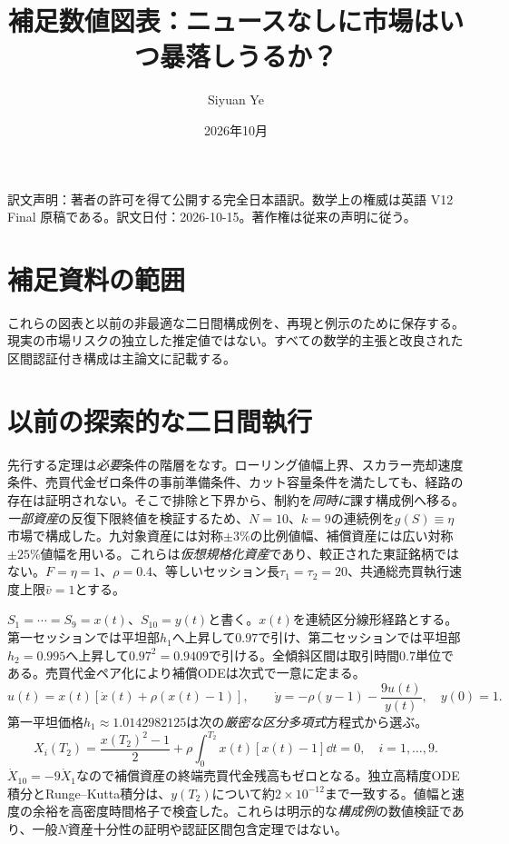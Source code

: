 \documentclass[10pt]{article}
\title{補足数値図表：ニュースなしに市場はいつ暴落しうるか？}
\author{Siyuan Ye}\date{2026年10月}
\begin{document}
\maketitle
{\small 訳文声明：著者の許可を得て公開する完全日本語訳。数学上の権威は英語 V12 Final 原稿である。訳文日付：2026-10-15。著作権は従来の声明に従う。}\par
\section*{補足資料の範囲}
これらの図表と以前の非最適な二日間構成例を、再現と例示のために保存する。現実の市場リスクの独立した推定値ではない。すべての数学的主張と改良された区間認証付き構成は主論文に記載する。
\section*{以前の探索的な二日間執行}

先行する定理は\emph{必要}条件の階層をなす。ローリング値幅上界、スカラー売却速度条件、売買代金ゼロ条件の事前準備条件、カット容量条件を満たしても、経路の存在は証明されない。そこで排除と下界から、制約を\emph{同時に}課す構成例へ移る。\emph{一部資産}の反復下限終値を検証するため、$N=10$、$k=9$の連続例を$g(S)\equiv\eta$市場で構成した。九対象資産には対称$\pm3\%$の比例値幅、補償資産には広い対称$\pm25\%$値幅を用いる。これらは\emph{仮想規格化資産}であり、較正された東証銘柄ではない。$F=\eta=1$、$\rho=0.4$、等しいセッション長$\tau_1=\tau_2=20$、共通総売買執行速度上限$\bar v=1$とする。

$S_1=\cdots=S_9=x(t)$、$S_{10}=y(t)$と書く。$x(t)$を連続区分線形経路とする。第一セッションでは平坦部$h_1$へ上昇して$0.97$で引け、第二セッションでは平坦部$h_2=0.995$へ上昇して$0.97^2=0.9409$で引ける。全傾斜区間は取引時間$0.7$単位である。売買代金ペア化により補償ODEは次式で一意に定まる。
\begin{equation}\label{eq:multiday-witness-ode}
 u(t)=x(t)[\dot x(t)+\rho(x(t)-1)],\qquad
 \dot y=-\rho(y-1)-\frac{9u(t)}{y(t)},\quad y(0)=1.
\end{equation}
第一平坦価格$h_1\approx1.0142982125$は次の\emph{厳密な区分多項式}方程式から選ぶ。
\begin{equation}\label{eq:multiday-closed}
 X_i(T_2)=\frac{x(T_2)^2-1}{2}+\rho\int_0^{T_2}x(t)[x(t)-1]\dd t=0,
 \quad i=1,\ldots,9.
\end{equation}
$\dot X_{10}=-9\dot X_1$なので補償資産の終端売買代金残高もゼロとなる。独立高精度ODE積分とRunge--Kutta積分は、$y(T_2)$について約$2\times10^{-12}$まで一致する。値幅と速度の余裕を高密度時間格子で検査した。これらは明示的な\emph{構成例}の数値検証であり、一般$N$資産十分性の証明や認証区間包含定理ではない。
\end{document}
